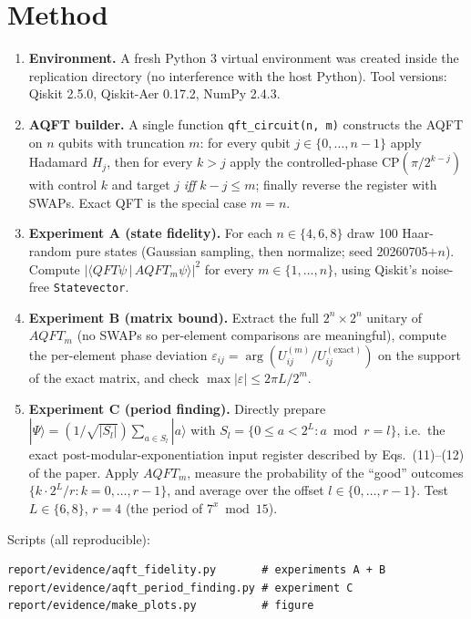 \documentclass[11pt]{article}
\begin{document}
\section{Method}\label{sec:method}
\begin{enumerate}
\item \textbf{Environment.} A fresh Python 3 virtual environment was
created inside the replication directory (no interference with the host
Python). Tool versions: Qiskit 2.5.0, Qiskit-Aer 0.17.2, NumPy 2.4.3.
\item \textbf{AQFT builder.} A single function \texttt{qft\_circuit(n, m)}
constructs the AQFT on $n$ qubits with truncation $m$: for every qubit
$j\in\{0,\dots,n-1\}$ apply Hadamard $H_j$, then for every $k>j$ apply
the controlled-phase $\mathrm{CP}(\pi/2^{k-j})$ with control $k$ and target
$j$ \emph{iff} $k-j\le m$; finally reverse the register with SWAPs.
Exact QFT is the special case $m=n$.
\item \textbf{Experiment A (state fidelity).} For each $n\in\{4,6,8\}$
draw 100 Haar-random pure states (Gaussian sampling, then normalize;
seed 20260705$+n$). Compute $|\langle QFT\psi\,|\,AQFT_m\psi\rangle|^2$
for every $m\in\{1,\dots,n\}$, using Qiskit's noise-free
\texttt{Statevector}.
\item \textbf{Experiment B (matrix bound).} Extract the full $2^n\times 2^n$
unitary of $AQFT_m$ (no SWAPs so per-element comparisons are meaningful),
compute the per-element phase deviation $\varepsilon_{ij} = \arg(U^{(m)}_{ij}/U^{(\text{exact})}_{ij})$
on the support of the exact matrix, and check $\max|\varepsilon| \le 2\pi L/2^m$.
\item \textbf{Experiment C (period finding).} Directly prepare
$|\Psi\rangle = (1/\sqrt{|S_l|})\sum_{a\in S_l} |a\rangle$ with
$S_l=\{0\le a<2^L: a\bmod r=l\}$, i.e.\ the exact post-modular-exponentiation
input register described by Eqs.~(11)--(12) of the paper. Apply $AQFT_m$,
measure the probability of the ``good'' outcomes
$\{k\cdot 2^L/r : k=0,\dots,r-1\}$, and average over the offset
$l\in\{0,\dots,r-1\}$. Test $L\in\{6,8\}$, $r=4$ (the period of
$7^x\bmod 15$).
\end{enumerate}

Scripts (all reproducible):
\begin{lstlisting}
report/evidence/aqft_fidelity.py       # experiments A + B
report/evidence/aqft_period_finding.py # experiment C
report/evidence/make_plots.py          # figure
\end{lstlisting}
\end{document}
